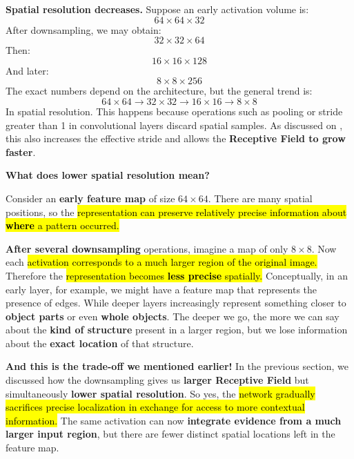 \highspace
\textcolor{Green3}{ \textbf{Spatial resolution decreases.}} Suppose an early activation volume is:
\begin{equation*}
    64\times64\times32
\end{equation*}
After downsampling, we may obtain:
\begin{equation*}
    32\times32\times64
\end{equation*}
Then:
\begin{equation*}
    16\times16\times128
\end{equation*}
And later:
\begin{equation*}
    8\times8\times256
\end{equation*}
The exact numbers depend on the architecture, but the general trend is:
\begin{equation*}
    64\times64
    \rightarrow
    32\times32
    \rightarrow
    16\times16
    \rightarrow
    8\times8
\end{equation*}
In spatial resolution. This happens because operations such as pooling or stride greater than 1 in convolutional layers discard spatial samples. As discussed on , this also increases the effective stride and allows the \textbf{Receptive Field to grow faster}.

\newpage

\begin{flushleft}
    \textcolor{Green3}{ \textbf{What does lower spatial resolution mean?}}
\end{flushleft}
Consider an \textbf{early feature map} of size $64\times64$. There are many spatial positions, so the \hl{representation can preserve relatively precise information about \textbf{where} a pattern occurred.}

\highspace
\textbf{After several downsampling} operations, imagine a map of only $8\times8$. Now each \hl{activation corresponds to a much larger region of the original image.} Therefore the \hl{representation becomes \textbf{less precise} spatially.} Conceptually, in an early layer, for example, we might have a feature map that represents the presence of edges. While deeper layers increasingly represent something closer to \textbf{object parts} or even \textbf{whole objects}. The deeper we go, the more we can say about the \textbf{kind of structure} present in a larger region, but we lose information about the \textbf{exact location} of that structure.

\highspace
\textcolor{Green3}{ \textbf{And this is the trade-off we mentioned earlier!}} In the previous section, we discussed how the downsampling gives us \textbf{larger Receptive Field} but simultaneously \textbf{lower spatial resolution}. So yes, the \hl{network gradually sacrifices precise localization in exchange for access to more contextual information.} The same activation can now \textbf{integrate evidence from a much larger input region}, but there are fewer distinct spatial locations left in the feature map.

